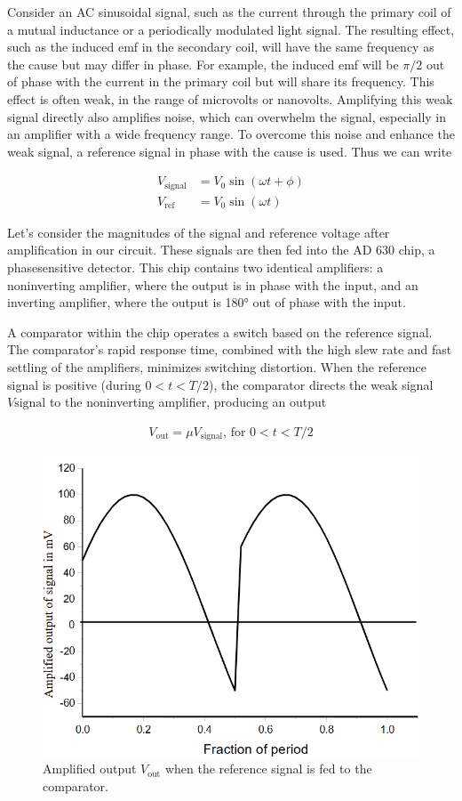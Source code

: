 Consider an AC sinusoidal signal, such as the current
through the primary coil of a mutual inductance or
a periodically modulated light signal. The resulting
effect, such as the induced emf in the secondary coil,
will have the same frequency as the cause but may
differ in phase. For example, the induced emf will be
$\pi/2$ out of phase with the current in the primary coil
but will share its frequency. This effect is often weak,
in the range of microvolts or nanovolts. Amplifying
this weak signal directly also amplifies noise, which
can overwhelm the signal, especially in an amplifier
with a wide frequency range. To overcome this noise
and enhance the weak signal, a reference signal in
phase with the cause is used. Thus we can write

\begin{align}
    V_\text{signal} &= V_0 \sin(\omega t+\phi)\\
    V_\text{ref} &= V_0 \sin(\omega t)
\end{align}

Let’s consider the magnitudes of the signal and reference voltage after amplification in our circuit. These
signals are then fed into the AD 630 chip, a phasesensitive detector. This chip contains two identical
amplifiers: a noninverting amplifier, where the output is in phase with the input, and an inverting amplifier, where the output is 180° out of phase with
the input.

A comparator within the chip operates a switch
based on the reference signal.
The comparator’s
rapid response time, combined with the high slew
rate and fast settling of the amplifiers, minimizes
switching distortion. When the reference signal is
positive (during $0 < t < T/2$), the comparator directs the weak signal $V\text{signal}$ to the noninverting amplifier, producing an output

\begin{align}
    V_\text{out} = \mu V_\text{signal}\text{, for } 0 < t < T/2
\end{align}

\begin{figure}
    \centering
    \includegraphics[width=.7\columnwidth]{images/f1.png}
    \caption{Amplified output $V_\text{out}$ when the reference signal is fed to the
    comparator.}
\end{figure}


